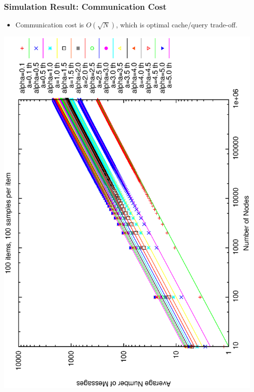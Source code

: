 \documentclass[red]{beamer}
\begin{document}
\begin{frame}
\frametitle{Simulation Result: Communication Cost}
\begin{itemize}
\item Communication cost is $O(\sqrt{N})$, which is optimal cache/query trade-off.
\end{itemize}
\center
\includegraphics[angle=270,scale=0.29]{figs/th_hops_loglog.eps}

\end{frame}
\end{document}
